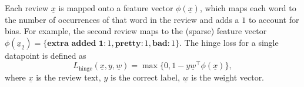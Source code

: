 \documentclass{article}
\renewcommand{\vec}[1]{\underline{#1}}
\theoremstyle{definition}
\newtheorem*{answer}{Answer}
\begin{document}
\begin{question}
	Each review $\underline{x}$ is mapped onto a feature vector $\phi(\underline{x})$, which maps each word to the number of occurrences of that word in the review and adds a $1$ to account for bias. For example, the second review maps to the (sparse) feature vector $\phi(\underline{x}_2)=\{\textbf{extra added 1}:1, \textbf{pretty}:1,\textbf{bad}:1\}$. The hinge loss for a single datapoint is defined as
	\begin{equation*}
		L_{\text{hinge}}(\underline{x}, y,\underline{w})= \max\{0, 1-y\underline{w}^\top\phi(\underline{x})\},
	\end{equation*}
	where $\underline{x}$ is the review text, $y$ is the correct label, $\underline{w}$ is the weight vector.
	\begin{question}
%		
%		

\end{question}
\end{question}
\end{document}
